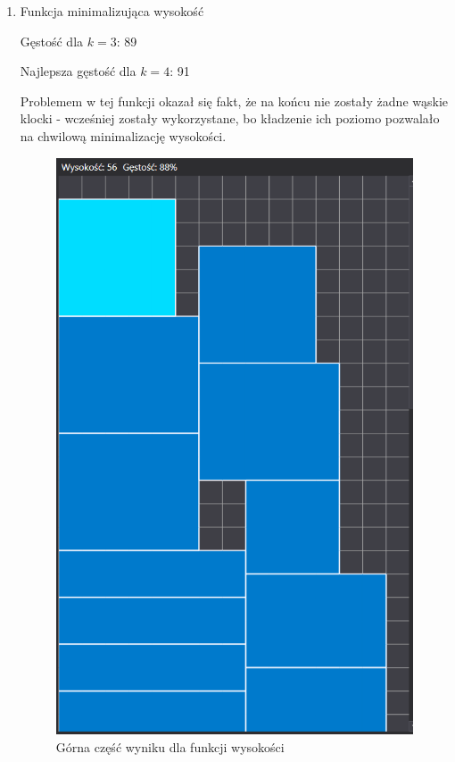 \documentclass{article}
\begin{document}
\begin{enumerate}
\item Funkcja minimalizująca wysokość

Gęstość dla $k=3$: 89

Najlepsza gęstość dla $k=4$: 91

Problemem w tej funkcji okazał się fakt, że na końcu nie zostały żadne wąskie klocki - wcześniej zostały wykorzystane, bo kładzenie ich poziomo pozwalało na chwilową minimalizację wysokości.
\begin{figure}[H]
\includegraphics[width=\textwidth]{prostokaty_wysokosc.PNG}
\caption{Górna część wyniku dla funkcji wysokości}
\end{figure}


\end{enumerate}
\end{document}
